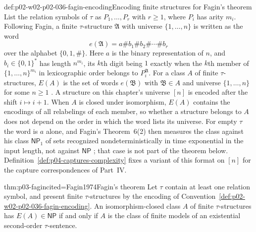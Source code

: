 \begin{hbconvention}{def:p02-w02-p02-036-fagin-encoding}{Encoding finite structures for Fagin's theorem}
List the relation symbols of \(\tau\) as \(P_1,\ldots,P_r\) with \(r\geq1\),
where \(P_i\) has arity \(m_i\).  Following Fagin, a finite \(\tau\)-structure
\(\mathfrak A\) with universe \(\{1,\ldots,n\}\) is written as the word
\[
 e(\mathfrak A)=a\#b_1\#b_2\#\cdots\#b_r
\]
over the alphabet \(\{0,1,\#\}\).  Here \(a\) is the binary representation of
\(n\), and \(b_i\in\{0,1\}^*\) has length \(n^{m_i}\), its \(k\)th digit
being \(1\) exactly when the \(k\)th member of \(\{1,\ldots,n\}^{m_i}\) in
lexicographic order belongs to \(P_i^{\mathfrak A}\).  For a class \(A\) of
finite \(\tau\)-structures, \(E(A)\) is the set of words \(e(\mathfrak B)\)
with \(\mathfrak B\in A\) and universe \(\{1,\ldots,n\}\) for some \(n\geq1\)
\cite[pp.~52--53]{Fagin1974}.  A structure on this chapter's universe
\([n]\) is encoded after the shift \(i\mapsto i+1\).  When \(A\) is closed
under isomorphism, \(E(A)\) contains the encodings of all relabelings of each
member, so whether a structure belongs to \(A\) does not depend on the order
in which the word lists its universe.  For empty \(\tau\) the word is
\(a\) alone, and Fagin's Theorem~6(2) then measures the class against his
class \(\mathsf{NP}_1\) of sets recognized nondeterministically in time
exponential in the input length, not against \(\mathsf{NP}\)
\cite[pp.~51, 53]{Fagin1974}; that case is not part of the theorem below.  Definition~\ref{def:p04-captures-complexity} fixes a variant
of this format on \([n]\) for the capture correspondences of Part~IV.
\end{hbconvention}

\begin{hbtheorem}{thm:p03-fagin}{cited=Fagin1974}{Fagin's theorem}
Let \(\tau\) contain at least one relation symbol, and present finite
\(\tau\)-structures by the encoding of
Convention~\ref{def:p02-w02-p02-036-fagin-encoding}.  An isomorphism-closed
class \(A\) of finite \(\tau\)-structures has \(E(A)\in\mathsf{NP}\) if and
only if \(A\) is the class of finite models of an existential second-order
\(\tau\)-sentence.
\end{hbtheorem}

